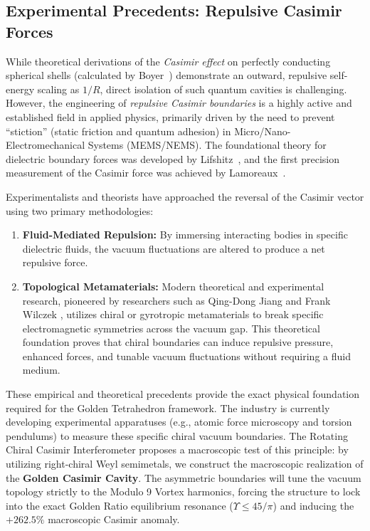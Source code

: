 \subsection{Experimental Precedents: Repulsive Casimir Forces}
While theoretical derivations of the \emph{Casimir effect} on perfectly conducting spherical shells (calculated by Boyer~\cite{Boyer1968}) demonstrate an outward, repulsive self-energy scaling as $1/R$, direct isolation of such quantum cavities is challenging. However, the engineering of \emph{repulsive Casimir boundaries} is a highly active and established field in applied physics, primarily driven by the need to prevent ``stiction'' (static friction and quantum adhesion) in Micro/Nano-Electromechanical Systems (MEMS/NEMS). The foundational theory for dielectric boundary forces was developed by Lifshitz~\cite{Lifshitz1956}, and the first precision measurement of the Casimir force was achieved by Lamoreaux~\cite{Lamoreaux1997}.

Experimentalists and theorists have approached the reversal of the Casimir vector using two primary methodologies:
\begin{enumerate}
    \item \textbf{Fluid-Mediated Repulsion:} By immersing interacting bodies in specific dielectric fluids, the vacuum fluctuations are altered to produce a net repulsive force.
    \item \textbf{Topological Metamaterials:} Modern theoretical and experimental research, pioneered by researchers such as Qing-Dong Jiang and Frank Wilczek \cite{jiang_wilczek2019}, utilizes chiral or gyrotropic metamaterials to break specific electromagnetic symmetries across the vacuum gap. This theoretical foundation proves that chiral boundaries can induce repulsive pressure, enhanced forces, and tunable vacuum fluctuations without requiring a fluid medium.
\end{enumerate}

These empirical and theoretical precedents provide the exact physical foundation required for the Golden Tetrahedron framework. The industry is currently developing experimental apparatuses (e.g., atomic force microscopy and torsion pendulums) to measure these specific chiral vacuum boundaries. The Rotating Chiral Casimir Interferometer proposes a macroscopic test of this principle: by utilizing right-chiral Weyl semimetals, we construct the macroscopic realization of the \textbf{Golden Casimir Cavity}. The asymmetric boundaries will tune the vacuum topology strictly to the Modulo 9 Vortex harmonics, forcing the structure to lock into the exact Golden Ratio equilibrium resonance ($\Upsilon \le 45/\pi$) and inducing the $+262.5\%$ macroscopic Casimir anomaly.

